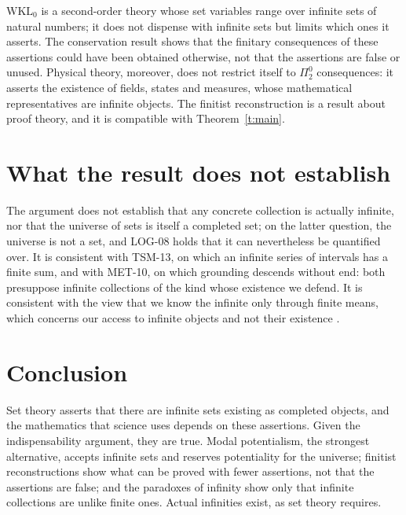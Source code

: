 \documentclass{situationist-preprint}
\begin{document}
\begin{reply}
$\mathrm{WKL}_0$ is a second-order theory whose set variables range over infinite sets of natural numbers; it does not dispense with infinite sets but limits which ones it asserts. The conservation result shows that the finitary consequences of these assertions could have been obtained otherwise, not that the assertions are false or unused. Physical theory, moreover, does not restrict itself to $\Pi^0_2$ consequences: it asserts the existence of fields, states and measures, whose mathematical representatives are infinite objects. The finitist reconstruction is a result about proof theory, and it is compatible with Theorem~\ref{t:main}.
\end{reply}

\section{What the result does not establish}

The argument does not establish that any concrete collection is actually infinite, nor that the universe of sets is itself a completed set; on the latter question, the universe is not a set, and LOG-08 holds that it can nevertheless be quantified over. It is consistent with TSM-13, on which an infinite series of intervals has a finite sum, and with MET-10, on which grounding descends without end: both presuppose infinite collections of the kind whose existence we defend. It is consistent with the view that we know the infinite only through finite means, which concerns our access to infinite objects and not their existence \citep{Moore1990}.

\section{Conclusion}

Set theory asserts that there are infinite sets existing as completed objects, and the mathematics that science uses depends on these assertions. Given the indispensability argument, they are true. Modal potentialism, the strongest alternative, accepts infinite sets and reserves potentiality for the universe; finitist reconstructions show what can be proved with fewer assertions, not that the assertions are false; and the paradoxes of infinity show only that infinite collections are unlike finite ones. Actual infinities exist, as set theory requires.
\end{document}
